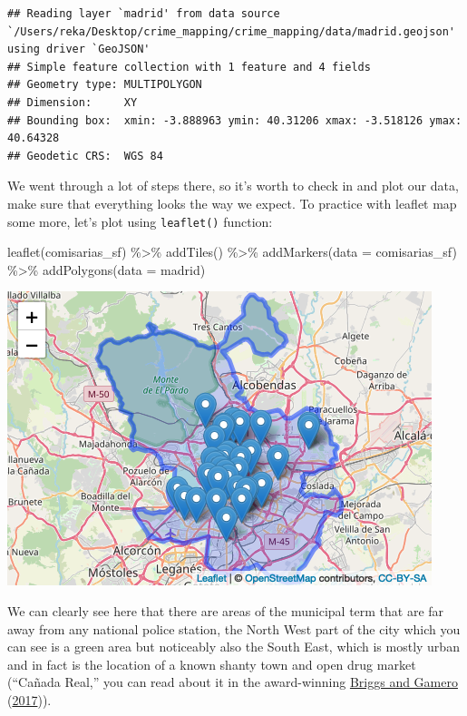 \documentclass[
]{book}
\makeatletter
\newenvironment{Shaded}{\begin{snugshade}}{\end{snugshade}}
\newcommand{\AttributeTok}[1]{\textcolor[rgb]{0.61,0.61,0.61}{#1}}
\newcommand{\FunctionTok}[1]{\textcolor[rgb]{0,0,0}{#1}}
\newcommand{\NormalTok}[1]{#1}
\newcommand{\SpecialCharTok}[1]{\textcolor[rgb]{0,0,0}{#1}}
\newenvironment{kframe}{%
\medskip{}
\setlength{\fboxsep}{.8em}
 \def\at@end@of@kframe{}%
 \ifinner\ifhmode%
  \def\at@end@of@kframe{\end{minipage}}%
  \begin{minipage}{\columnwidth}%
 \fi\fi%
 \def\FrameCommand##1{\hskip\@totalleftmargin \hskip-\fboxsep
 \colorbox{shadecolor}{##1}\hskip-\fboxsep
     \hskip-\linewidth \hskip-\@totalleftmargin \hskip\columnwidth}%
 \MakeFramed {\advance\hsize-\width
   \@totalleftmargin\z@ \linewidth\hsize
   \@setminipage}}%
 {\par\unskip\endMakeFramed%
 \at@end@of@kframe}
\renewenvironment{Shaded}{\begin{kframe}}{\end{kframe}}
\makeatother
\begin{document}
\begin{verbatim}
## Reading layer `madrid' from data source `/Users/reka/Desktop/crime_mapping/crime_mapping/data/madrid.geojson' using driver `GeoJSON'
## Simple feature collection with 1 feature and 4 fields
## Geometry type: MULTIPOLYGON
## Dimension:     XY
## Bounding box:  xmin: -3.888963 ymin: 40.31206 xmax: -3.518126 ymax: 40.64328
## Geodetic CRS:  WGS 84
\end{verbatim}

We went through a lot of steps there, so it's worth to check in and plot our data, make sure that everything looks the way we expect. To practice with leaflet map some more, let's plot using \texttt{leaflet()} function:

\begin{Shaded}
\begin{Highlighting}[]
\FunctionTok{leaflet}\NormalTok{(comisarias\_sf) }\SpecialCharTok{\%\textgreater{}\%} 
  \FunctionTok{addTiles}\NormalTok{() }\SpecialCharTok{\%\textgreater{}\%}
  \FunctionTok{addMarkers}\NormalTok{(}\AttributeTok{data =}\NormalTok{ comisarias\_sf) }\SpecialCharTok{\%\textgreater{}\%}
  \FunctionTok{addPolygons}\NormalTok{(}\AttributeTok{data =}\NormalTok{ madrid)}
\end{Highlighting}
\end{Shaded}

\includegraphics{crime_mapping_files/figure-latex/unnamed-chunk-60-1.png}

We can clearly see here that there are areas of the municipal term that are far away from any national police station, the North West part of the city which you can see is a green area but noticeably also the South East, which is mostly urban and in fact is the location of a known shanty town and open drug market (``Cañada Real,'' you can read about it in the award-winning \protect\hyperlink{ref-Briggs_2017}{Briggs and Gamero} (\protect\hyperlink{ref-Briggs_2017}{2017})).
\end{document}
